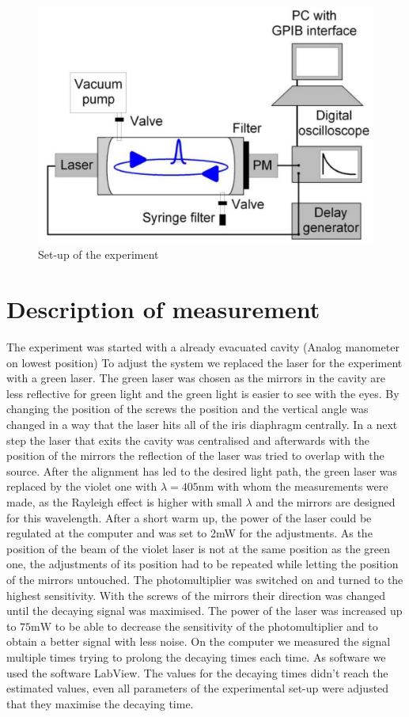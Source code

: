 \documentclass[
	parskip=half,10pt,
	numbers= noenddot, %
	toc=flat, %
	oneside,
	twocolumn,
	]{scrartcl}
\begin{document}
\begin{figure}[b]
\includegraphics[width = .48 \textwidth]{images/aufbau.pdf}
\caption{Set-up of the experiment \citep{wiki}}
\label{fig:experiment}
\end{figure}
\section{Description of measurement}
The experiment was started with a already evacuated cavity (Analog manometer on lowest position)
To adjust the system we replaced the laser for the experiment with a green laser. The green laser was chosen as the mirrors in the cavity are less reflective for green light and the green light is easier to see with the eyes. By changing the position of the screws the position and the vertical angle was changed in a way that the laser hits all of the iris diaphragm centrally. In a next step the laser that exits the cavity was centralised and afterwards with the position of the mirrors the reflection of the laser was tried to overlap with the source. After the alignment has led to the desired light path, the green laser was replaced by the violet one with $\lambda=405\si{\nano \meter}$ with whom the measurements were made, as the Rayleigh effect is higher with small $\lambda$ and the mirrors are designed for this wavelength. After a short warm up, the power of the laser could be regulated at the computer and was set to 2mW for the adjustments. As the position of the beam of the violet laser is not at the same position as the green one, the adjustments of its position had to be repeated while letting the position of the mirrors untouched.
The photomultiplier was switched on and turned to the highest sensitivity. With the screws of the mirrors their direction was changed until the decaying signal was maximised.
The power of the laser was increased up to $75\si{\milli \watt}$ to be able to decrease the sensitivity of the photomultiplier and to obtain a better signal with less noise.
On the computer we measured the signal multiple times trying to prolong the decaying times each time. As software we used the software LabView. The values for the decaying times didn't reach the estimated values, even all parameters of the experimental set-up were adjusted that they maximise the decaying time.
\end{document}

